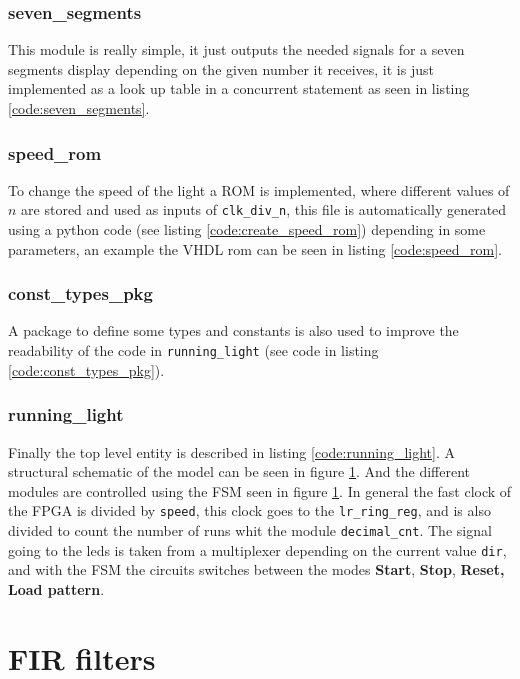 \documentclass[12pt]{article}   	%
\begin{document}
\subsubsection{seven\_segments}
This module is really simple, it just outputs the needed signals for a seven segments display depending on the given number it receives, it is just implemented as a look up table in a concurrent statement as seen in listing \ref{code:seven_segments}.


\subsubsection{speed\_rom}
To change the speed of the light a ROM is implemented, where different values of $n$ are stored and used as inputs of \lstinline{clk_div_n}, this file is automatically generated using a python code (see listing \ref{code:create_speed_rom}) depending in some parameters, an example the VHDL rom can be seen in listing \ref{code:speed_rom}.

\subsubsection{const\_types\_pkg}
A package to define some types and constants is also used to improve the readability of the code in \lstinline{running_light} (see code in listing \ref{code:const_types_pkg}).

\subsubsection{running\_light}

Finally the top level entity is described in listing \ref{code:running_light}. A structural schematic of the model can be seen in figure \ref{}. And the different modules are controlled using the FSM seen in figure \ref{}. In general the fast clock of the FPGA is divided by \lstinline{speed}, this clock goes to the \lstinline{lr_ring_reg}, and is also divided to count the number of runs whit the module \lstinline{decimal_cnt}. The signal going to the leds is taken from a multiplexer depending on the current value \lstinline{dir}, and with the FSM the circuits switches between the modes \textbf{Start}, \textbf{Stop}, \textbf{Reset, Load pattern}.




\section{FIR filters}
\end{document}
